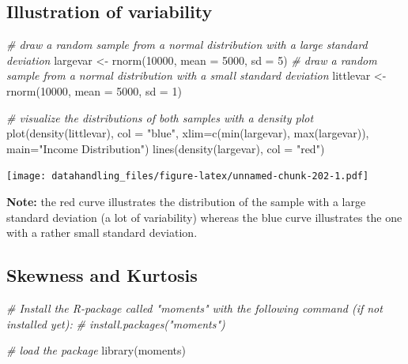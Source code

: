 \documentclass[
  12pt,
]{style/krantz}
\newenvironment{Shaded}{\begin{snugshade}}{\end{snugshade}}
\newcommand{\AttributeTok}[1]{\textcolor[rgb]{0.77,0.63,0.00}{#1}}
\newcommand{\CommentTok}[1]{\textcolor[rgb]{0.56,0.35,0.01}{\textit{#1}}}
\newcommand{\DecValTok}[1]{\textcolor[rgb]{0.00,0.00,0.81}{#1}}
\newcommand{\FunctionTok}[1]{\textcolor[rgb]{0.00,0.00,0.00}{#1}}
\newcommand{\NormalTok}[1]{#1}
\newcommand{\OtherTok}[1]{\textcolor[rgb]{0.56,0.35,0.01}{#1}}
\newcommand{\StringTok}[1]{\textcolor[rgb]{0.31,0.60,0.02}{#1}}
\begin{document}
\hypertarget{illustration-of-variability}{%
\subsection{Illustration of variability}\label{illustration-of-variability}}

\begin{Shaded}
\begin{Highlighting}[]
\CommentTok{\# draw a random sample from a normal distribution with a large standard deviation}
\NormalTok{largevar }\OtherTok{\textless{}{-}} \FunctionTok{rnorm}\NormalTok{(}\DecValTok{10000}\NormalTok{, }\AttributeTok{mean =} \DecValTok{5000}\NormalTok{, }\AttributeTok{sd =} \DecValTok{5}\NormalTok{)}
\CommentTok{\# draw a random sample from a normal distribution with a small standard deviation}
\NormalTok{littlevar }\OtherTok{\textless{}{-}} \FunctionTok{rnorm}\NormalTok{(}\DecValTok{10000}\NormalTok{, }\AttributeTok{mean =} \DecValTok{5000}\NormalTok{, }\AttributeTok{sd =} \DecValTok{1}\NormalTok{)}

\CommentTok{\# visualize the distributions of both samples with a density plot}
\FunctionTok{plot}\NormalTok{(}\FunctionTok{density}\NormalTok{(littlevar), }\AttributeTok{col =} \StringTok{"blue"}\NormalTok{, }
     \AttributeTok{xlim=}\FunctionTok{c}\NormalTok{(}\FunctionTok{min}\NormalTok{(largevar), }\FunctionTok{max}\NormalTok{(largevar)), }\AttributeTok{main=}\StringTok{"Income Distribution"}\NormalTok{)}
\FunctionTok{lines}\NormalTok{(}\FunctionTok{density}\NormalTok{(largevar), }\AttributeTok{col =} \StringTok{"red"}\NormalTok{)}
\end{Highlighting}
\end{Shaded}

\texttt{[image: datahandling\_files/figure-latex/unnamed-chunk-202-1.pdf]}

\textbf{Note:} the red curve illustrates the distribution of the sample with a large standard deviation (a lot of variability) whereas the blue curve illustrates the one with a rather small standard deviation.

\hypertarget{skewness-and-kurtosis}{%
\subsection{Skewness and Kurtosis}\label{skewness-and-kurtosis}}

\begin{Shaded}
\begin{Highlighting}[]
\CommentTok{\# Install the R{-}package called "moments" with the following command (if not installed yet):}
\CommentTok{\# install.packages("moments")}

\CommentTok{\# load the package}
\FunctionTok{library}\NormalTok{(moments)}
\end{Highlighting}
\end{Shaded}
\end{document}
